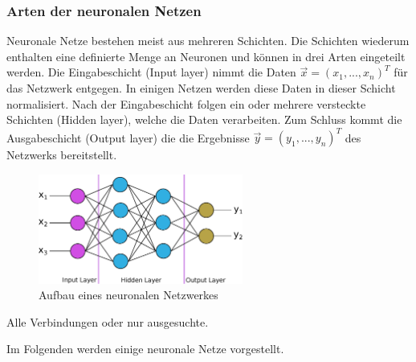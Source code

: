 
\subsubsection{Arten der neuronalen Netzen}
Neuronale Netze bestehen meist aus mehreren Schichten. Die Schichten wiederum enthalten eine definierte Menge an Neuronen und können in drei Arten eingeteilt werden. Die Eingabeschicht (Input layer) nimmt die Daten $\overrightarrow{x}=(x_{1}, ..., x_{n})^T$ für das Netzwerk entgegen. In einigen Netzen werden diese Daten in dieser Schicht normalisiert. Nach der Eingabeschicht folgen ein oder mehrere versteckte Schichten (Hidden layer), welche die Daten verarbeiten. Zum Schluss kommt die Ausgabeschicht (Output layer) die die Ergebnisse $\overrightarrow{y}=(y_{1}, ..., y_{n})^T$ des Netzwerks bereitstellt.


\begin{figure}[!ht]
	\includegraphics[width=0.6\textwidth]{content/chapter_basics/images/neuronal_network.eps}
	\centering
	\caption{Aufbau eines neuronalen Netzwerkes}
	\label{img:neural_network}
\end{figure}

Alle Verbindungen oder nur ausgesuchte.\vspace{0.2cm}

Im Folgenden werden einige neuronale Netze vorgestellt.\vspace{0.2cm}

